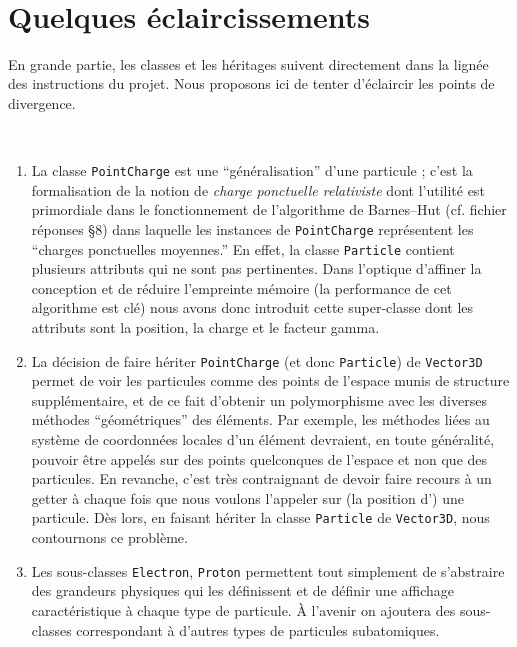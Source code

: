 \documentclass[12pt, letterpaper, twoside]{article}
\newcommand{\T}[1]{\texttt{#1}}
\begin{document}
\ \linebreak
\ \linebreak
\section{Quelques éclaircissements}
\noindent En grande partie, les classes et les héritages suivent directement dans la lignée des instructions du projet. Nous proposons ici de tenter d'éclaircir les points de divergence.

\ \linebreak
\begin{enumerate}
	\item La classe \T{PointCharge} est une ``généralisation'' d'une particule ; c'est la formalisation de la notion de \textit{charge ponctuelle relativiste} dont l'utilité est primordiale dans le fonctionnement de l'algorithme de Barnes--Hut (cf. fichier réponses \S 8) dans laquelle les instances de \T{PointCharge} représentent les ``charges ponctuelles moyennes.'' En effet, la classe \T{Particle} contient plusieurs attributs qui ne sont pas pertinentes. Dans l'optique d'affiner la conception et de réduire l'empreinte mémoire (la performance de cet algorithme est clé) nous avons donc introduit cette super-classe dont les attributs sont la position, la charge et le facteur gamma.

	\item La décision de faire hériter \T{PointCharge} (et donc \T{Particle}) de \T{Vector3D} permet de voir les particules comme des points de l'espace munis de structure supplémentaire, et de ce fait d'obtenir un polymorphisme avec les diverses méthodes ``géométriques'' des éléments. Par exemple, les méthodes liées au système de coordonnées locales d'un élément devraient, en toute généralité, pouvoir être appelés sur des points quelconques de l'espace et non que des particules. En revanche, c'est très contraignant de devoir faire recours à un getter à chaque fois que nous voulons l'appeler sur (la position d') une particule. Dès lors, en faisant hériter la classe \T{Particle} de \T{Vector3D}, nous contournons ce problème.

	\item Les sous-classes \T{Electron}, \T{Proton} permettent tout simplement de s'abstraire des grandeurs physiques qui les définissent et de définir une affichage caractéristique à chaque type de particule. À l'avenir on ajoutera des sous-classes correspondant à d'autres types de particules subatomiques.


\end{enumerate}
\end{document}
